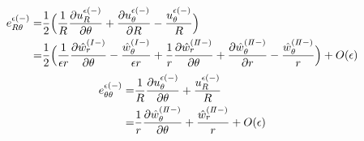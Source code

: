 \begin{align}
	e_{R\theta}^{\epsilon(-)}
		=&\frac{1}{2}\Bigl( \frac{1}{R}\frac{\partial u_{R}^{\epsilon(-)}}{\partial \theta}
			+\frac{\partial u_{\theta}^{\epsilon(-)}}{\partial R}-\frac{u_{\theta}^{\epsilon(-)}}{R}\Bigr)
		\nonumber
		\\
		=&\frac{1}{2}\Bigl( \frac{1}{\epsilon r}\frac{\partial \hat{w}_{r}^{(I-)}}{\partial \theta}
			-\frac{\hat{w}_{\theta}^{(I-)}}{\epsilon r}
			+\frac{1}{r}\frac{\partial \hat{w}_{r}^{(I\hspace{-.15em}I-)}}{\partial \theta}
			+\frac{\partial \hat{w}_{\theta}^{(I\hspace{-.15em}I-)}}{\partial r}
			-\frac{\hat{w}_{\theta}^{(I\hspace{-.15em}I-)}}{r}\Bigr)+O(\epsilon)
\end{align}
\begin{align}
	e_{\theta\theta}^{\epsilon(-)}
		=&\frac{1}{R}\frac{\partial u_{\theta}^{\epsilon(-)}}{\partial \theta}
			+\frac{u_{R}^{\epsilon(-)}}{R}
		\nonumber
		\\
		=&\frac{1}{r}\frac{\partial \hat{w}_{\theta}^{(I\hspace{-.15em}I-)}}{\partial \theta}
			+\frac{\hat{w}_{r}^{(I\hspace{-.15em}I-)}}{r}+O(\epsilon)
\end{align}

